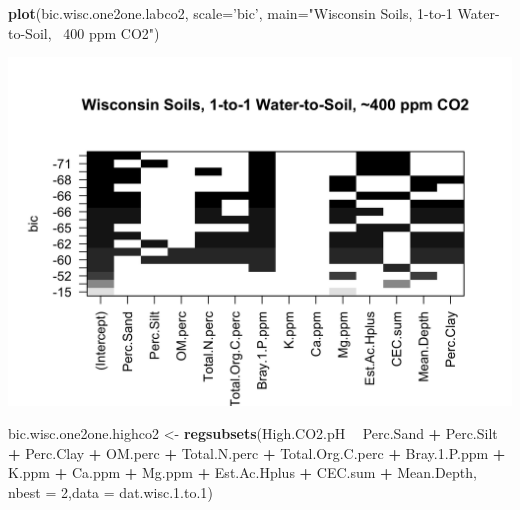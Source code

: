 \documentclass[]{article}
\newenvironment{Shaded}{\begin{snugshade}}{\end{snugshade}}
\newcommand{\DataTypeTok}[1]{\textcolor[rgb]{0.13,0.29,0.53}{#1}}
\newcommand{\DecValTok}[1]{\textcolor[rgb]{0.00,0.00,0.81}{#1}}
\newcommand{\FloatTok}[1]{\textcolor[rgb]{0.00,0.00,0.81}{#1}}
\newcommand{\KeywordTok}[1]{\textcolor[rgb]{0.13,0.29,0.53}{\textbf{#1}}}
\newcommand{\NormalTok}[1]{#1}
\newcommand{\OperatorTok}[1]{\textcolor[rgb]{0.81,0.36,0.00}{\textbf{#1}}}
\newcommand{\StringTok}[1]{\textcolor[rgb]{0.31,0.60,0.02}{#1}}
\begin{document}
\begin{Shaded}
\begin{Highlighting}[]
\KeywordTok{plot}\NormalTok{(bic.wisc.one2one.labco2, }\DataTypeTok{scale=}\StringTok{'bic'}\NormalTok{, }\DataTypeTok{main=}\StringTok{"Wisconsin Soils, 1-to-1 Water-to-Soil, ~400 ppm CO2"}\NormalTok{)}
\end{Highlighting}
\end{Shaded}

\includegraphics{output-rmd/bic.wisc.one2one.labco2-1.png}

\begin{Shaded}
\begin{Highlighting}[]
\NormalTok{bic.wisc.one2one.highco2 <-}\StringTok{ }\KeywordTok{regsubsets}\NormalTok{(High.CO2.pH }\OperatorTok{~}\StringTok{ }\NormalTok{Perc.Sand }\OperatorTok{+}\StringTok{ }\NormalTok{Perc.Silt }\OperatorTok{+}\StringTok{ }\NormalTok{Perc.Clay }\OperatorTok{+}\StringTok{ }\NormalTok{OM.perc }\OperatorTok{+}\StringTok{ }\NormalTok{Total.N.perc }\OperatorTok{+}\StringTok{ }\NormalTok{Total.Org.C.perc }\OperatorTok{+}\StringTok{ }\NormalTok{Bray.}\FloatTok{1.}\NormalTok{P.ppm }\OperatorTok{+}\StringTok{ }\NormalTok{K.ppm }\OperatorTok{+}\StringTok{ }\NormalTok{Ca.ppm }\OperatorTok{+}\StringTok{ }\NormalTok{Mg.ppm }\OperatorTok{+}\StringTok{ }\NormalTok{Est.Ac.Hplus }\OperatorTok{+}\StringTok{ }\NormalTok{CEC.sum }\OperatorTok{+}\StringTok{ }\NormalTok{Mean.Depth, }\DataTypeTok{nbest =} \DecValTok{2}\NormalTok{,}\DataTypeTok{data =}\NormalTok{ dat.wisc.}\FloatTok{1.}\NormalTok{to}\FloatTok{.1}\NormalTok{)}
\end{Highlighting}
\end{Shaded}
\end{document}

